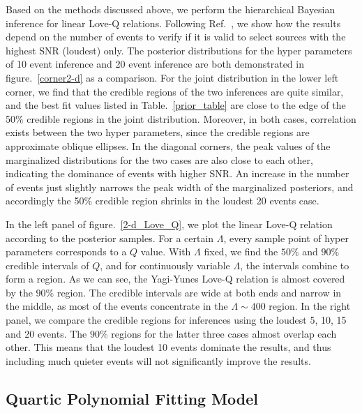 \documentclass[a4paper,11pt]{article}
\begin{document}
Based on the methods discussed above, we perform the hierarchical Bayesian inference for linear Love-Q relations. Following Ref.~\cite{Lackey:2014fwa}, 
we show how the results depend on the number of events to verify if it is valid to select sources with the highest SNR (loudest) only. 
The posterior distributions for the hyper parameters of 10 event inference and 20 event inference are both demonstrated in figure.~\ref{corner2-d} as a comparison. 
For the joint distribution in the lower left corner, we find that the credible regions of the two inferences are quite similar,
and the best fit values listed in Table.~\ref{prior_table} are close to the edge of the 50\% credible regions in the joint distribution. 
Moreover, in both cases, correlation exists between the two hyper parameters, since the credible regions are approximate oblique ellipses. 
In the diagonal corners, the peak values of the marginalized distributions for the two cases are also close to each other, indicating the dominance of events with higher SNR. 
An increase in the number of events just slightly narrows the peak width of the marginalized posteriors, and accordingly the 50\% credible region shrinks in the loudest 20 events case. 

In the left panel of figure.~\ref{2-d_Love_Q}, we plot the linear Love-Q relation according to the posterior samples. For a certain $\Lambda$, 
every sample point of hyper parameters corresponds to a $Q$ value. With $\Lambda$ fixed, we find the $50\%$ and $90\%$ credible intervals of $Q$, 
and for continuously variable $\Lambda$, the intervals combine to form a region. As we can see, the Yagi-Yunes Love-Q relation is almost covered by the $90\%$ region. 
The credible intervals are wide at both ends and narrow in the middle, as most of the events concentrate in the $\Lambda \sim 400$ region. 
In the right panel, we compare the credible regions for inferences using the loudest 5, 10, 15 and 20 events. 
The $90\%$ regions for the latter three cases almost overlap each other. This means that the loudest 10 events dominate the results, 
and thus including much quieter events will not significantly improve the results.

\subsection{Quartic Polynomial Fitting Model}
\label{sec4_2}
\end{document}
